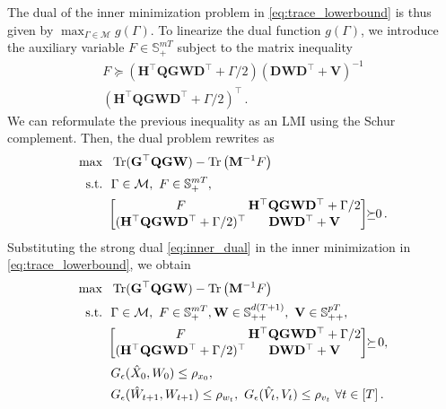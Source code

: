 \documentclass[letterpaper, 10 pt, conference]{ieeeconf}  %
\makeatletter
\renewenvironment{proof}[1][\proofname]{\par
  \pushQED{\qed}%
  \normalfont \topsep\z@
  \trivlist
  \item[\hskip2em
        \itshape
    #1\@addpunct{:}]\ignorespaces
}{%
  \popQED\endtrivlist\@endpefalse
}
\theoremstyle{ieeeconf}
\DeclareMathOperator{\Tr}{Tr}
\makeatother
\begin{document}
\begin{proof}
\noindent
The dual of the inner minimization problem in \eqref{eq:trace_lowerbound} is thus given by 
$\max_{\Gamma \in \mathcal{M}} g(\Gamma)$.
To linearize the dual function $g(\Gamma)$, we introduce the auxiliary variable $F \in \mathbb{S}_{+}^{mT}$ 
subject to the matrix inequality
\[
\begin{multlined}
F \succeq 
  (\mathbf{H^{\top} Q G W D^{\top}} + \Gamma/2)
    (\mathbf{D W D^{\top} + V})^{-1}
    \\
    (\mathbf{H^{\top} Q G W D^{\top}} + \Gamma/2)^{\top}\,.
\end{multlined}
\]
We can reformulate the previous inequality as an LMI using the Schur complement. Then, the dual problem rewrites as
\begin{equation}
\label{eq:inner_dual}
\begin{aligned}
\max \ \ &\Tr(\mathbf{G^{\top} Q G W}) - 
\Tr\big(\mathbf{M}^{-1} F\big)
\\[1pt]
\text{s.t.} \ \ & 
\Gamma \in \mathcal{M}, \ 
F \in \mathbb{S}_{+}^{mT},
\\[1pt]
& 
\!\!\setlength\arraycolsep{.9pt}
\begin{bmatrix}
F & \mathbf{H^{\top} Q G W D^{\top}} + \Gamma/2
\\[1pt]
(\mathbf{H^{\top} Q G W D^{\top}} + \Gamma/2)^{\top} & \mathbf{D W D^{\top} + V}
\end{bmatrix}
\!\!\succeq\!\!0\,.
\end{aligned}
\end{equation}
Substituting the strong dual \eqref{eq:inner_dual} in the inner minimization in \eqref{eq:trace_lowerbound}, we obtain
\begin{align*}
  \max \ \ &\Tr(\mathbf{G^{\top} Q G W}) - 
\Tr\big(\mathbf{M}^{-1} F\big)
\\[1pt]
\text{s.t.} \ \ & 
\Gamma \in \mathcal{M}, \ 
F \in \mathbb{S}_{+}^{mT},\mathbf{W} \in \mathbb{S}_{++}^{d(T+1)}, \ 
\mathbf{V} \in \mathbb{S}_{++}^{pT},
\\[1pt]
& 
\!\!\setlength\arraycolsep{.9pt}
\begin{bmatrix}
F & \mathbf{H^{\top} Q G W D^{\top}} + \Gamma/2
\\[1pt]
(\mathbf{H^{\top} Q G W D^{\top}} + \Gamma/2)^{\top} & \mathbf{D W D^{\top} + V}
\end{bmatrix}
\!\!\succeq\! 0,
\\[1pt]
&G_\epsilon(\hat{X}_0, W_0) \leq \rho_{x_0},
\\
&G_\epsilon(\hat{W}_{t+1}, W_{t+1}) \leq \rho_{w_t},\ G_\epsilon(\hat{V}_t, V_t) \leq \rho_{v_t} \ \forall t \in [T]\,.

\end{align*}
\end{proof}
\end{document}
